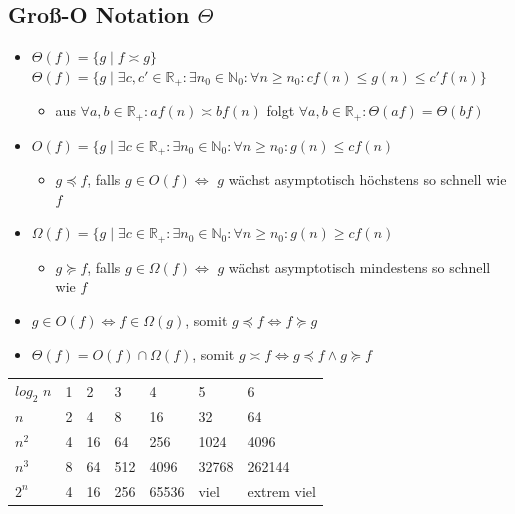 \documentclass[a4paper,portrait]{scrartcl}
\begin{document}
\subsection{Groß-O Notation $\Theta$ }
\begin{itemize}
\item $ \Theta (f) = \lbrace g \mid f \asymp g \rbrace $ \\
$ \Theta (f) = \lbrace g \mid \exists c,c' \in \mathbb{R}_{+}: \exists n_{0} \in \mathbb{N}_{0}: \forall n \geq n_{0}: cf(n) \leq g(n) \leq c'f(n) \rbrace $ 
\begin{itemize}
  \item aus $ \forall a,b \in \mathbb{R}_{+}: af(n) \asymp bf(n) $ folgt $ \forall a,b \in \mathbb{R}_{+}: \Theta (af) = \Theta (bf) $
\end{itemize}
\item $ O(f) = \lbrace g \mid \exists c \in \mathbb{R}_{+}: \exists n_{0} \in \mathbb{N}_{0}: \forall n \geq n_{0}: g(n) \leq cf(n)$
\begin{itemize}
  \item $ g \preceq f $, falls $ g \in O(f) \Leftrightarrow$ $g$ wächst asymptotisch höchstens so schnell wie $f$
\end{itemize}
\item $ \Omega (f) = \lbrace g \mid \exists c \in \mathbb{R}_{+}: \exists n_{0} \in \mathbb{N}_{0}: \forall n \geq n_{0}: g(n) \geq cf(n)$
\begin{itemize}
  \item $ g \succeq f $, falls $ g \in \Omega (f) \Leftrightarrow$ $g$ wächst asymptotisch mindestens so schnell wie $f$
\end{itemize}
\item $ g \in O(f) \Leftrightarrow f \in \Omega (g) $, somit $ g \preceq f \Leftrightarrow f \succeq g $
\item $ \Theta (f) = O(f) \cap \Omega (f) $, somit $ g \asymp f \Leftrightarrow g \preceq f \wedge g \succeq f $
\end{itemize}
\begin{tabular}{lllllll}
\hline
$log_{2}$ $n$&1&2&3&4&5&6 \\
$n$&2&4&8&16&32&64 \\
$n^2$&4&16&64&256&1024&4096 \\
$n^3$&8&64&512&4096&32768&262144 \\
$2^n$&4&16&256&65536&viel&extrem viel \\
\hline
\end{tabular}
\end{document}
